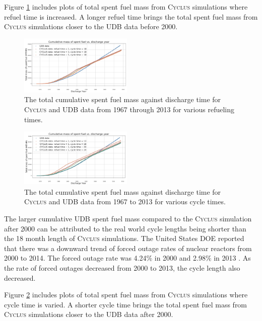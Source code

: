 \documentclass{anstrans}
\newcommand{\Cyclus}{\textsc{Cyclus}\xspace}%
\begin{document}
Figure \ref{fig:total_refueltime} includes plots of total spent fuel mass from 
\Cyclus simulations where refuel time is increased. A longer refuel time brings 
the total spent fuel mass from \Cyclus simulations closer to the UDB data 
before 2000. 

\begin{figure}[t] 
	\centering
	\includegraphics[width=0.48\textwidth]{figures/total_cumulative_mass_spent_fuel_refueltime}
	\caption{The total cumulative spent fuel mass against discharge time for \Cyclus and UDB data from 1967 through 2013 for various refueling times.}
	\label{fig:total_refueltime}
\end{figure} 

\begin{figure}[b] %
	\centering
	\includegraphics[width=0.48\textwidth]{figures/total_cumulative_mass_spent_fuel_cycletime}
	\caption{The total cumulative spent fuel mass against discharge time for \Cyclus and UDB data from 1967 to 2013 for various cycle times.}
	\label{fig:total_cycletime}
\end{figure} 

The larger cumulative UDB spent fuel mass compared to the \Cyclus simulation 
after 2000 can be attributed to the real world cycle lengths being shorter than 
the 18 month length of \Cyclus simulations. The United States DOE reported that 
there was a downward trend of forced outage rates of nuclear reactors from 2000 
to 2014. The forced outage rate was 4.24\% in 2000 and 2.98\% in 2013 
\cite{gehin_nuclear_2016}. As the rate of forced outages decreased from 2000 to 
2013, the cycle length also decreased. 

Figure \ref{fig:total_cycletime} includes plots of total spent fuel mass from 
\Cyclus simulations where cycle time is varied. A shorter cycle time brings the 
total spent fuel mass from \Cyclus simulations closer to the UDB data after 
2000. 
\end{document}
